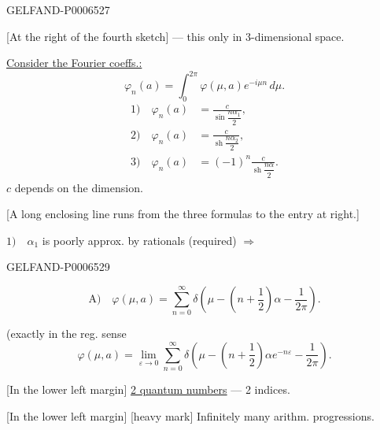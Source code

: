 \begin{GelfandAdjacentEvidence}{GELFAND-P000652}{7}


[At the right of the fourth sketch] --- this only in 3-dimensional space.

\underline{Consider the Fourier coeffs.:}
\[
\varphi_n(a)=\int_0^{2\pi}\varphi(\mu,a)e^{-i\mu n}\,d\mu.
\]
\begin{align*}
1)\quad\varphi_n(a)&=\frac{c}{\sin\dfrac{n\alpha_1}{2}},\\
2)\quad\varphi_n(a)&=\frac{c}{\operatorname{sh}\dfrac{n\alpha_2}{2}},\\
3)\quad\varphi_n(a)&=(-1)^n\frac{c}{\operatorname{sh}\dfrac{n\alpha}{2}}.
\end{align*}
\(c\) depends on the dimension.

[A long enclosing line runs from the three formulas to the entry at right.]

\(1)\quad\alpha_1\) is poorly approx. by rationals (required) \(\Longrightarrow\)

\end{GelfandAdjacentEvidence}
\begin{GelfandAdjacentEvidence}{GELFAND-P000652}{9}

\[
\text{A)}\quad
\varphi(\mu,a)=\sum_{n=0}^{\infty}
\delta\left(\mu-\left(n+\frac12\right)\alpha-\frac1{2\pi}\right).
\]

(exactly in the reg. sense
\[
\varphi(\mu,a)=\lim_{\varepsilon\to0}\sum_{n=0}^{\infty}
\delta\left(\mu-\left(n+\frac12\right)\alpha e^{-n\varepsilon}-\frac1{2\pi}\right).
\]

[In the lower left margin] \underline{2 quantum numbers} --- 2 indices.

[In the lower left margin] [heavy mark] Infinitely many arithm. progressions.
\end{GelfandAdjacentEvidence}



